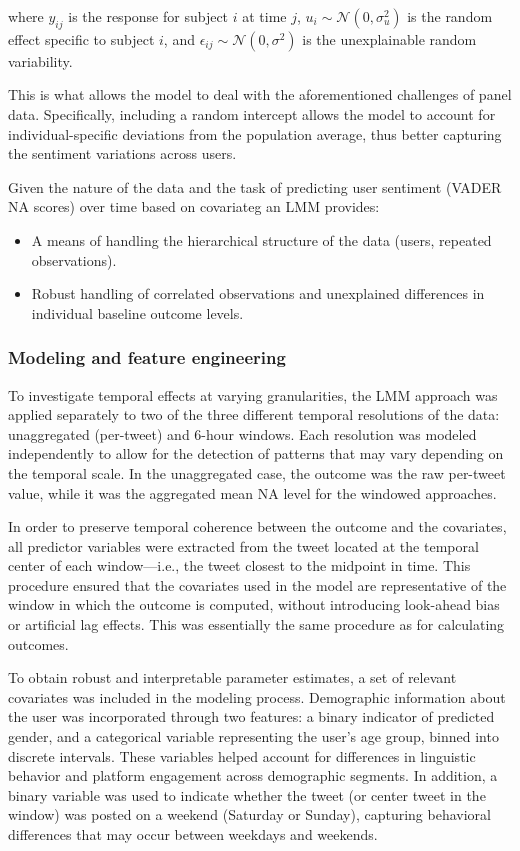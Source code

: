 where $y_{ij}$ is the response for subject $i$ at time $j$, $u_i \sim \mathcal{N}(0, \sigma_u^2)$ is the random effect specific to subject $i$, and $\epsilon_{ij} \sim \mathcal{N}(0, \sigma^2)$ is the unexplainable random variability.

This is what allows the model to deal with the aforementioned challenges of panel data. Specifically, including a random intercept allows the model to account for individual-specific deviations from the population average, thus better capturing the sentiment variations across users.

Given the nature of the data and the task of predicting user sentiment (VADER NA scores) over time based on covariateg an LMM provides:
\begin{itemize}
    \item A means of handling the hierarchical structure of the data (users, repeated observations).
    \item Robust handling of correlated observations and unexplained differences in individual baseline outcome levels.
\end{itemize}

\subsubsection{Modeling and feature engineering}



To investigate temporal effects at varying granularities, the LMM approach was applied separately to two of the three different temporal resolutions of the data: unaggregated (per-tweet) and 6-hour windows. Each resolution was modeled independently to allow for the detection of patterns that may vary depending on the temporal scale. In the unaggregated case, the outcome was the raw per-tweet value, while it was the aggregated mean NA level for the windowed approaches.

In order to preserve temporal coherence between the outcome and the covariates, all predictor variables were extracted from the tweet located at the temporal center of each window—i.e., the tweet closest to the midpoint in time. This procedure ensured that the covariates used in the model are representative of the window in which the outcome is computed, without introducing look-ahead bias or artificial lag effects. This was essentially the same procedure as for calculating outcomes.

To obtain robust and interpretable parameter estimates, a set of relevant covariates was included in the modeling process. Demographic information about the user was incorporated through two features: a binary indicator of predicted gender, and a categorical variable representing the user’s age group, binned into discrete intervals. These variables helped account for differences in linguistic behavior and platform engagement across demographic segments. In addition, a binary variable was used to indicate whether the tweet (or center tweet in the window) was posted on a weekend (Saturday or Sunday), capturing behavioral differences that may occur between weekdays and weekends.

